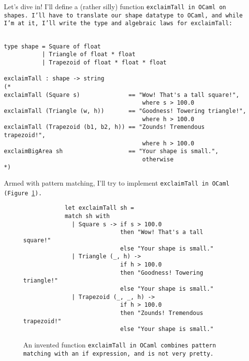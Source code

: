\documentclass[manuscript,screen,review, 12pt, nonacm]{acmart}
\begin{document}
\begin{outline}[enumerate]
    Let's dive in! I'll define a (rather silly) function \tt{exclaimTall} in
    OCaml on \tt{shape}s. I'll have to translate our \tt{shape} datatype to
    OCaml, and while I'm at it, I'll write the type and algebraic laws for
    \tt{exclaimTall}:

    \begin{minipage}[t]{\textwidth}        
        \centering 
        \begin{verbatim}

type shape = Square of float 
           | Triangle of float * float
           | Trapezoid of float * float * float

exclaimTall : shape -> string 
(*
exclaimTall (Square s)              == "Wow! That's a tall square!", 
                                        where s > 100.0
exclaimTall (Triangle (w, h))       == "Goodness! Towering triangle!",
                                        where h > 100.0
exclaimTall (Trapezoid (b1, b2, h)) == "Zounds! Tremendous trapezoid!", 
                                        where h > 100.0
exclaimBigArea sh                   == "Your shape is small.", 
                                        otherwise
*)
    \end{verbatim}
    \end{minipage}

    Armed with pattern matching, I'll try to implement \tt{exclaimTall} in OCaml
    (Figure~\ref{fig:ifexclaimtall}).

    \begin{figure}[ht]
        \begin{verbatim}
            let exclaimTall sh =
            match sh with 
              | Square s -> if s > 100.0 
                            then "Wow! That's a tall square!"
                            else "Your shape is small." 
              | Triangle (_, h) -> 
                            if h > 100.0 
                            then "Goodness! Towering triangle!"
                            else "Your shape is small." 
              | Trapezoid (_, _, h) -> 
                            if h > 100.0
                            then "Zounds! Tremendous trapezoid!"
                            else "Your shape is small." 
            \end{verbatim}    
        \caption{An invented function \tt{exclaimTall} in OCaml combines pattern
        matching with an \tt{if} expression, and is not very pretty.}   
        \label{fig:ifexclaimtall}
    \end{figure}
    

\end{outline}
\end{document}

